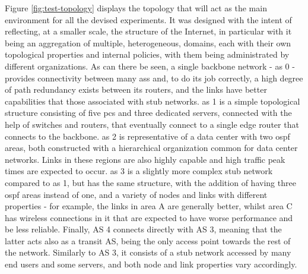     Figure \ref{fig:test-topology} displays the topology that will act as the main environment for all the devised experiments.
    It was designed with the intent of reflecting, at a smaller scale, the structure of the Internet, in particular with it being an aggregation of multiple, heterogeneous, domains, each with their own topological properties and internal policies, with them being administrated by different organizations.
    As can there be seen, a single backbone network - \gls{as} 0 - provides connectivity between many \glspl{as} and, to do its job correctly, a high degree of path redundancy exists between its routers, and the links have better capabilities that those associated with stub networks.
    \gls{as} 1 is a simple topological structure consisting of five \glspl{pc} and three dedicated servers, connected with the help of switches and routers, that eventually connect to a single edge router that connects to the backbone.
    \gls{as} 2 is representative of a data center with two \gls{ospf} areas, both constructed with a hierarchical organization common for data center networks.
    Links in these regions are also highly capable and high traffic peak times are expected to occur.
    \gls{as} 3 is a slightly more complex stub network compared to \gls{as} 1, but has the same structure, with the addition of having three \gls{ospf} areas instead of one, and a variety of nodes and links with different properties - for example, the links in area A are generally better, whilst area C has wireless connections in it that are expected to have worse performance and be less reliable.
    Finally, AS 4 connects directly with AS 3, meaning that the latter acts also as a transit AS, being the only access point towards the rest of the network.
    Similarly to AS 3, it consists of a stub network accessed by many end users and some servers, and both node and link properties vary accordingly.



